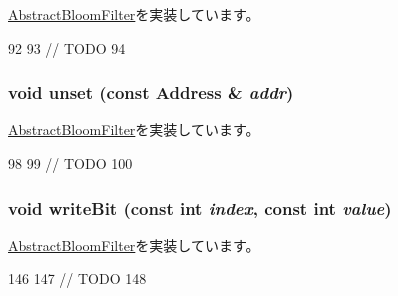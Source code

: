 \hyperlink{classAbstractBloomFilter_a54e1262ae5f60efeb8714d0556b3c32e}{AbstractBloomFilter}を実装しています。


\begin{DoxyCode}
92 {
93     // TODO
94 }
\end{DoxyCode}
\hypertarget{classLSB__CountingBloomFilter_a69b772787ea61467af679e3aa5406b41}{
\subsubsection[{unset}]{\setlength{\rightskip}{0pt plus 5cm}void unset (const {\bf Address} \& {\em addr})}}
\label{classLSB__CountingBloomFilter_a69b772787ea61467af679e3aa5406b41}


\hyperlink{classAbstractBloomFilter_a0a35d1c7bad19fe9362068a0d319ec5f}{AbstractBloomFilter}を実装しています。


\begin{DoxyCode}
98 {
99     // TODO
100 }
\end{DoxyCode}
\hypertarget{classLSB__CountingBloomFilter_ac188318778d26b44f567c5b530598c16}{
\subsubsection[{writeBit}]{\setlength{\rightskip}{0pt plus 5cm}void writeBit (const int {\em index}, \/  const int {\em value})}}
\label{classLSB__CountingBloomFilter_ac188318778d26b44f567c5b530598c16}


\hyperlink{classAbstractBloomFilter_a961813caf7bb3aece26914ac43c6293f}{AbstractBloomFilter}を実装しています。


\begin{DoxyCode}
146 {
147     // TODO
148 }
\end{DoxyCode}


